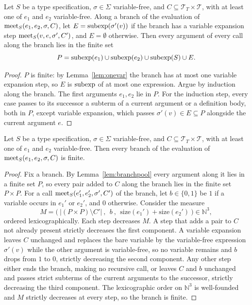 \documentclass[doc]{subfiles}
\begin{document}
\begin{lemma}\label{lem:branchpool}
	Let $S$ be a type specification, $\sigma \in \Sigma$ variable-free,
	and $C \subseteq \mathcal{T}_T \times \mathcal{T}$,
	with at least one of $e_1$ and $e_2$ variable-free.
	Along a branch of the evaluation of $\mathrm{meet}_S(e_1,e_2,\sigma,C)$,
	let $E = \mathrm{subexp}(\sigma'(v))$ if the branch has a variable expansion step $\mathrm{meet}_S(v,e,\sigma',C')$,
	and $E = \emptyset$ otherwise.
	Then every argument of every call along the branch lies in the finite set
	\[
		P = \mathrm{subexp}(e_1) \cup \mathrm{subexp}(e_2) \cup \mathrm{subexp}(S) \cup E.
	\]
\end{lemma}

\begin{proof}
	$P$ is finite: by Lemma~\ref{lem:onevar} the branch has at most one variable expansion step,
	so $E$ is $\mathrm{subexp}$ of at most one expression.
	Argue by induction along the branch. The first arguments $e_1, e_2$ lie in $P$.
	For the induction step, every case passes to its successor a subterm of a current
	argument or a definition body, both in $P$, except variable expansion,
	which passes $\sigma'(v) \in E \subseteq P$ alongside the current argument $e$.
\end{proof}

\begin{lemma}\label{lem:finitebranch}
	Let $S$ be a type specification, $\sigma \in \Sigma$ variable-free,
	and $C \subseteq \mathcal{T}_T \times \mathcal{T}$,
	with at least one of $e_1$ and $e_2$ variable-free.
	Then every branch of the evaluation of $\mathrm{meet}_S(e_1,e_2,\sigma,C)$ is finite.
\end{lemma}
\begin{proof}
	Fix a branch. By Lemma~\ref{lem:branchpool} every argument along it lies in a finite set $P$,
	so every pair added to $C$ along the branch lies in the finite set $P \times P$.
	For a call $\mathrm{meet}_S(e_1',e_2',\sigma',C')$ of the branch, let $b \in \{0,1\}$ be $1$
	if a variable occurs in $e_1'$ or $e_2'$, and $0$ otherwise. Consider the measure
	\[
		M = \Big(\ \big|(P \times P) \setminus C'\big| \ ,\ \ b \ ,\ \ \mathrm{size}(e_1') + \mathrm{size}(e_2') \ \Big) \in \mathbb{N}^3,
	\]
	ordered lexicographically.
	Each step decreases $M$. A step that adds a pair to $C$ not already present
	strictly decreases the first component. A variable expansion leaves $C$ unchanged
	and replaces the bare variable by the variable-free expression $\sigma'(v)$
	while the other argument is variable-free, so no variable remains and $b$ drops from $1$ to $0$,
	strictly decreasing the second component.
	Any other step either ends the branch, making no recursive call,
	or leaves $C$ and $b$ unchanged and passes strict subterms of the current arguments
	to the successor, strictly decreasing the third component.
	The lexicographic order on $\mathbb{N}^3$ is well-founded and $M$ strictly decreases at every step,
	so the branch is finite.
\end{proof}
\end{document}
